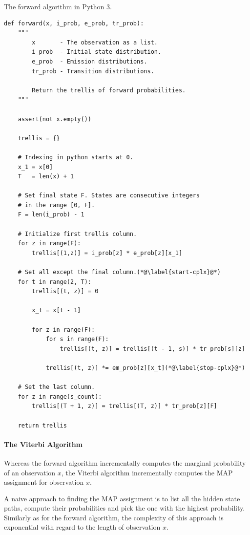 \begin{algorithm}[!p]
\begin{center}
\caption{The forward algorithm in Python 3.}\label{forward-algorithm}
\begin{lstlisting}[linewidth=\textwidth]
def forward(x, i_prob, e_prob, tr_prob): 
    """
        x       - The observation as a list.
        i_prob  - Initial state distribution.
        e_prob  - Emission distributions.
        tr_prob - Transition distributions.

        Return the trellis of forward probabilities. 
    """

    assert(not x.empty()) 

    trellis = {}

    # Indexing in python starts at 0.
    x_1 = x[0]
    T   = len(x) + 1

    # Set final state F. States are consecutive integers 
    # in the range [0, F]. 
    F = len(i_prob) - 1 

    # Initialize first trellis column.
    for z in range(F):
        trellis[(1,z)] = i_prob[z] * e_prob[z][x_1]

    # Set all except the final column.(*@\label{start-cplx}@*)
    for t in range(2, T):
        trellis[(t, z)] = 0

        x_t = x[t - 1]

        for z in range(F):
            for s in range(F):
                trellis[(t, z)] = trellis[(t - 1, s)] * tr_prob[s][z]

            trellis[(t, z)] *= em_prob[z][x_t](*@\label{stop-cplx}@*)

    # Set the last column.
    for z in range(s_count):
        trellis[(T + 1, z)] = trellis[(T, z)] * tr_prob[z][F]

    return trellis 
\end{lstlisting}
\end{center}
\end{algorithm}

\paragraph{The Viterbi Algorithm}
\label{hmm-viterbi}
Whereas the forward algorithm incrementally computes the marginal
probability of an observation $x$, the Viterbi algorithm incrementally
computes the MAP assignment for observation $x$.

A naive approach to finding the MAP assignment is to list all the
hidden state paths, compute their probabilities and pick the one with
the highest probability. Similarly as for the forward algorithm, the
complexity of this approach is exponential with regard to the length
of observation $x$.

